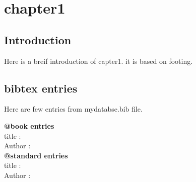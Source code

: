 \chapter{chapter1}
\section{Introduction}
Here is a breif introduction of capter1. it is based on footing.

\section{bibtex entries}
Here are few entries from mydatabse.bib file.

\textbf{@book entries}\\

title : \\
Author : \citeauthor{is4562000}\\

\textbf{@standard entries}\\

title : \\
Author : \citeauthor{aci31877}
